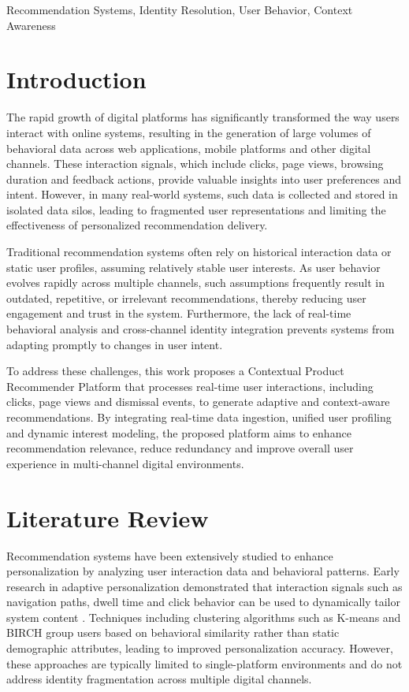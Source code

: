 \documentclass[conference]{IEEEtran}
\begin{document}
\begin{IEEEkeywords}
Recommendation Systems, Identity Resolution, User Behavior, Context Awareness
\end{IEEEkeywords}

\section{Introduction}
The rapid growth of digital platforms has significantly transformed the way users interact with online systems, resulting in the generation of large volumes of behavioral data across web applications, mobile platforms and other digital channels. These interaction signals, which include clicks, page views, browsing duration and feedback actions, provide valuable insights into user preferences and intent. However, in many real-world systems, such data is collected and stored in isolated data silos, leading to fragmented user representations and limiting the effectiveness of personalized recommendation delivery.

Traditional recommendation systems often rely on historical interaction data or static user profiles, assuming relatively stable user interests. As user behavior evolves rapidly across multiple channels, such assumptions frequently result in outdated, repetitive, or irrelevant recommendations, thereby reducing user engagement and trust in the system. Furthermore, the lack of real-time behavioral analysis and cross-channel identity integration prevents systems from adapting promptly to changes in user intent.

To address these challenges, this work proposes a Contextual Product Recommender Platform that processes real-time user interactions, including clicks, page views and dismissal events, to generate adaptive and context-aware recommendations. By integrating real-time data ingestion, unified user profiling and dynamic interest modeling, the proposed platform aims to enhance recommendation relevance, reduce redundancy and improve overall user experience in multi-channel digital environments.

\section{Literature Review}
Recommendation systems have been extensively studied to enhance personalization by analyzing user interaction data and behavioral patterns. Early research in adaptive personalization demonstrated that interaction signals such as navigation paths, dwell time and click behavior can be used to dynamically tailor system content \cite{kumar2024adaptive}. Techniques including clustering algorithms such as K-means and BIRCH group users based on behavioral similarity rather than static demographic attributes, leading to improved personalization accuracy. However, these approaches are typically limited to single-platform environments and do not address identity fragmentation across multiple digital channels.
\end{document}

